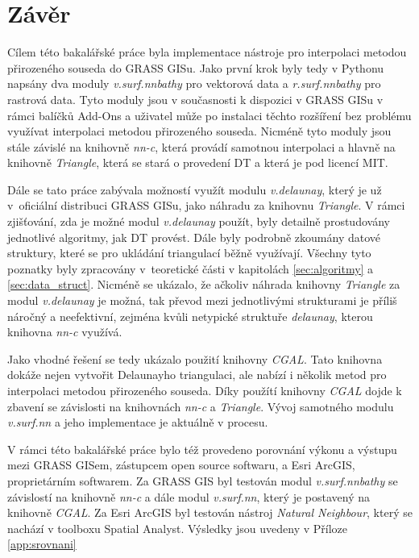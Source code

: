 \documentclass[12pt,a4paper]{article}
\begin{document}
{\newpage
\section{Závěr}

Cílem této bakalářské práce byla implementace nástroje pro interpolaci
metodou přirozeného souseda do GRASS GISu. Jako první krok byly tedy v
Pythonu napsány dva moduly \emph{v.surf.nnbathy} pro vektorová data a
\emph{r.surf.nnbathy} pro rastrová data. Tyto moduly jsou v
současnosti k dispozici v GRASS GISu v rámci balíčků Add-Ons a
uživatel může po instalaci těchto rozšíření bez problému využívat
interpolaci metodou přirozeného souseda. Nicméně tyto moduly jsou
stále závislé na knihovně \emph{nn-c}, která provádí samotnou
interpolaci a hlavně na knihovně \emph{Triangle}, která se stará o
provedení DT a která je pod licencí MIT.

Dále se tato práce zabývala možností využít modulu \emph{v.delaunay},
který je už v~oficiální distribuci GRASS GISu, jako náhradu za
knihovnu \emph{Triangle}. V rámci zjišťování, zda je možné modul
\emph{v.delaunay} použít, byly detailně prostudovány jednotlivé
algoritmy, jak DT provést. Dále byly podrobně zkoumány datové
struktury, které se pro ukládání triangulací běžně využívají. Všechny
tyto poznatky byly zpracovány v~teoretické části v kapitolách
\ref{sec:algoritmy} a \ref{sec:data_struct}. Nicméně se ukázalo, že
ačkoliv náhrada knihovny \emph{Triangle} za modul \emph{v.delaunay} je
možná, tak převod mezi jednotlivými strukturami je příliš náročný a
neefektivní, zejména kvůli netypické struktuře \emph{delaunay}, kterou
knihovna \emph{nn-c} využívá.

Jako vhodné řešení se tedy ukázalo použití knihovny \emph{CGAL}. Tato
knihovna dokáže nejen vytvořit Delaunayho triangulaci, ale nabízí i
několik metod pro interpolaci metodou přirozeného souseda. Díky
použítí knihovny \emph{CGAL} dojde k zbavení se závislosti na
knihovnách \emph{nn-c} a \emph{Triangle}. Vývoj samotného modulu
\emph{v.surf.nn} a jeho implementace je aktuálně v procesu.

V rámci této bakalářské práce bylo též provedeno porovnání výkonu a
výstupu mezi GRASS GISem, zástupcem open source softwaru, a Esri ArcGIS,
proprietárním softwarem. Za GRASS GIS byl testován modul
\emph{v.surf.nnbathy} se závislostí na knihovně \emph{nn-c} a dále
modul \emph{v.surf.nn}, který je postavený na knihovně \emph{CGAL}. Za
Esri ArcGIS byl testován nástroj \emph{Natural Neighbour}, který se nachází
v toolboxu Spatial Analyst. Výsledky jsou uvedeny v Příloze
\ref{app:srovnani}



}
\end{document}
